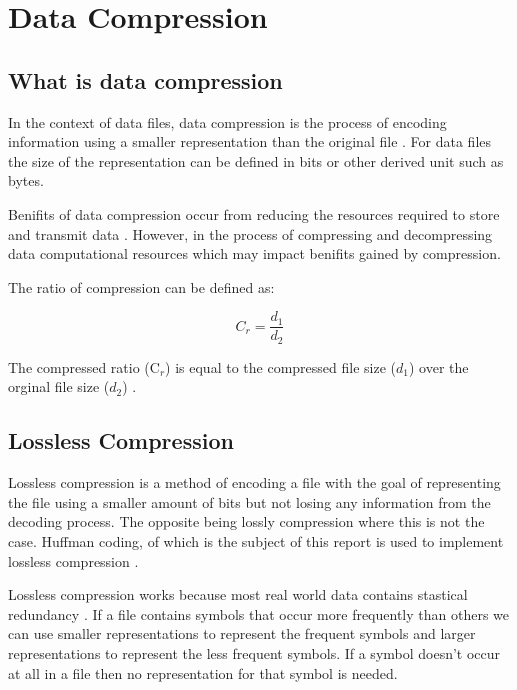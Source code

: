\section{Data Compression}
\doublespacing


\subsection{What is data compression}


\singlespacing
In the context of data files, data compression is the process of encoding information using a smaller representation than the original file \cite{WikiDataCompression}. For data files the size of the representation can be defined in bits or other derived unit such as bytes.


\doublespacing
\singlespacing
Benifits of data compression occur from reducing the resources required to store and transmit data \cite{WikiDataCompression}. However, in the process of compressing and decompressing data computational resources which may impact benifits gained by compression.


\doublespacing
\singlespacing
The ratio of compression can be defined as:


\begin{equation*}
  C_{r} = \dfrac{d_{1}}{d_{2}}
\end{equation*}


\doublespacing
\singlespacing
The compressed ratio (C$_{r}$) is equal to the compressed file size ($d_{1}$) over the orginal file size ($d_{2}$) \cite{MasseyStudyGuide}.


\doublespacing
\singlespacing
\subsection{Lossless Compression}


\singlespacing


Lossless compression is a method of encoding a file with the goal of representing the file using a smaller amount of bits but not losing any information from the decoding process. The opposite being lossly compression where this is not the case. Huffman coding, of which is the subject of this report is used to implement lossless compression \cite{WikiHuffman}.


\doublespacing
\singlespacing
Lossless compression works because most real world data contains stastical redundancy \cite{WikiDataCompression}. If a file contains symbols that occur more frequently than others we can use smaller representations to represent the frequent symbols and larger representations to represent the less frequent symbols. If a symbol doesn't occur at all in a file then no representation for that symbol is needed.


